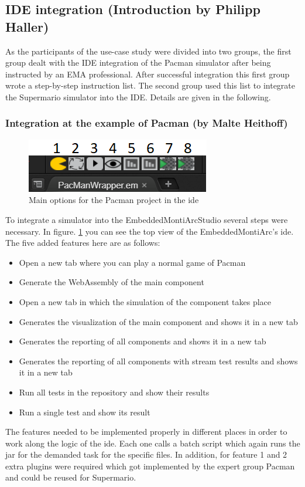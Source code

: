 \subsection{IDE integration (Introduction by Philipp Haller)}

As the participants of the use-case study were divided into two groups, the first group dealt with the IDE integration of the Pacman simulator after being instructed by an EMA professional.
After successful integration this first group wrote a step-by-step instruction list. The second group used this list to integrate the Supermario simulator into the IDE. Details are given in the following.

\subsubsection{Integration at the example of Pacman (by Malte Heithoff)}
\begin{figure}
	\caption{Main options for the Pacman project in the ide}
	\label{fig:idePacmanTop}
	\centering
	\includegraphics[scale=0.55]{pictures/IDE/IDETop.png}
\end{figure}
To integrate a simulator into the EmbeddedMontiArcStudio several steps were necessary. In figure. \ref{fig:idePacmanTop} you can see the top view of the EmbeddedMontiArc's ide. The five added features here are as follows:
\begin{itemize}
	\item[1.] Open a new tab where you can play a normal game of Pacman
	\item[2.] Generate the WebAssembly of the main component
	\item[3.] Open a new tab in which the simulation of the component takes place
	\item[4.] Generates the visualization of the main component and shows it in a new tab
	\item[5.] Generates the reporting of all components and shows it in a new tab
	\item[6.] Generates the reporting of all components with stream test results and shows it in a new tab
	\item[7.] Run all tests in the repository and show their results
	\item[8.] Run a single test and show its result
\end{itemize}
The features needed to be implemented properly in different places in order to work along the logic of the ide. Each one calls a batch script which again runs the jar for the demanded task for the specific files. In addition, for feature 1 and 2 extra plugins were required which got implemented by the expert group Pacman and could be reused for Supermario.